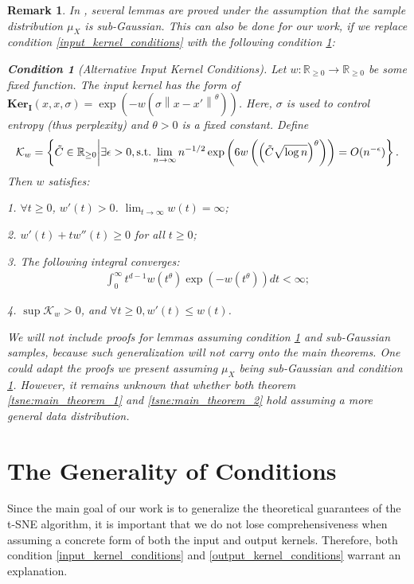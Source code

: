 \documentclass[10pt]{article}
\newcommand{\norm}[1]{\left\lVert#1\right\rVert}
\newtheorem{remark}{\bf Remark}
\newtheorem{condition}{\bf Condition}
\newenvironment{Proof of lemma}{\noindent{\bf Proof of Lemma}}{\hfill$\Box$\newline}
\newenvironment{Proof of claim}{\noindent{\bf Proof of claim}}{\hfill$\Box$\newline}
\newenvironment{Proof of theorem}{\noindent{\bf Proof of Theorem}}{\hfill\scriptsize{$\Box$}\newline}
\newenvironment{Proof of theorems}{\noindent{\bf Proof of Theorems}}{\hfill$\Box$\newline}
\newenvironment{Proof of proposition}{\noindent{\bf Proof of Proposition}}{\hfill$\Box$\newline}
\newenvironment{Proof of propositions}{\noindent{\bf Proof of Propositions}}{\hfill$\Box$\newline}
\newenvironment{Proof of exercise}{\noindent{\it Proof of Exercise:}}{\hfill$\Box$}
\numberwithin{equation}{section}
\newcommand{\ki}{\mathbf{Ker}_{\mathbf{I}}}
\begin{document}
\begin{remark}
    In \cite{auffinger-tsne}, several lemmas are proved under the assumption that the sample distribution $\mu_X$ is sub-Gaussian. This can also be done for our work, if we replace condition \ref{input_kernel_conditions} with the following condition \ref{input_kernel_conditions_ext}:
    \begin{condition}[Alternative Input Kernel Conditions] \label{input_kernel_conditions_ext}
        Let $w: \mathbb{R}_{\geq 0} \to \mathbb{R}_{\geq 0}$ be some fixed function. The input kernel has the form of $\ki(x,x,\sigma) = \exp(-w(\sigma\norm{x-x'}^{\theta}))$. Here, $\sigma$ is used to control entropy (thus perplexity) and $\theta>0$ is a fixed constant. Define
        \begin{align} \label{tsne:kw_def}
            \mathcal{K}_w = \left\{\tilde{C} \in \mathbb{R}_{\geq 0} \bigg\rvert \exists \epsilon>0, \text{\normalfont s.t.} \lim_{n \to \infty} n^{-1/2} \exp \left(6 w\left(\left(\tilde{C} \sqrt{\log n} \right)^{\theta} \right) \right) = O(n^{-\epsilon}) \right\}.
        \end{align}
        Then $w$ satisfies:

        1. $\forall t \geq 0$, $w'(t)>0$. $\lim_{t \to \infty} w(t) = \infty$;

        2. $w'(t)+tw''(t) \geq 0$ for all $t \geq 0$;

        3. The following integral converges:
        \begin{align}
            \int_0^{\infty} t^{d-1} w(t^{\theta}) \exp(-w(t^{\theta}))dt < \infty;
        \end{align}

        4. $\sup \mathcal{K}_w > 0$, and $\forall t \geq 0, w'(t) \leq w(t)$.
    \end{condition}
    We will not include proofs for lemmas assuming condition \ref{input_kernel_conditions_ext} and sub-Gaussian samples, because such generalization will not carry onto the main theorems. One could adapt the proofs we present assuming $\mu_X$ being sub-Gaussian and condition \ref{input_kernel_conditions_ext}. However, it remains unknown that whether both theorem \ref{tsne:main_theorem_1} and \ref{tsne:main_theorem_2} hold assuming a more general data distribution.
\end{remark}
\section{The Generality of Conditions} \label{tsne:sec:generality_conditions}
Since the main goal of our work is to generalize the theoretical guarantees of
the t-SNE algorithm, it is important that we do not lose comprehensiveness when
assuming a concrete form of both the input and output kernels. Therefore, both
condition \ref{input_kernel_conditions} and \ref{output_kernel_conditions}
warrant an explanation.
\end{document}
